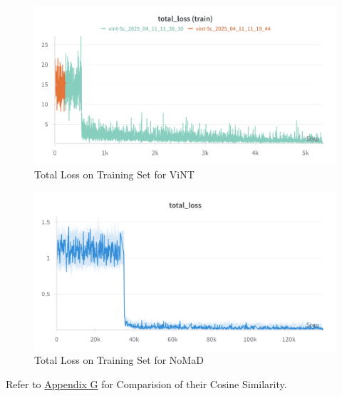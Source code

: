 \documentclass[12pt]{article}
\begin{document}
\begin{figure}[H]
    \centering
    \includegraphics[width=\textwidth]{images/distloss_vint.png}
    \caption{Total Loss on Training Set for ViNT}
\end{figure}
\begin{figure}[H]
    \centering
    \includegraphics[width=\textwidth]{images/total_loss.png}
    \caption{Total Loss on Training Set for NoMaD}
\end{figure}
Refer to \hyperref[app:wandb]{Appendix G} for Comparision of their Cosine Similarity.\\
\end{document}
